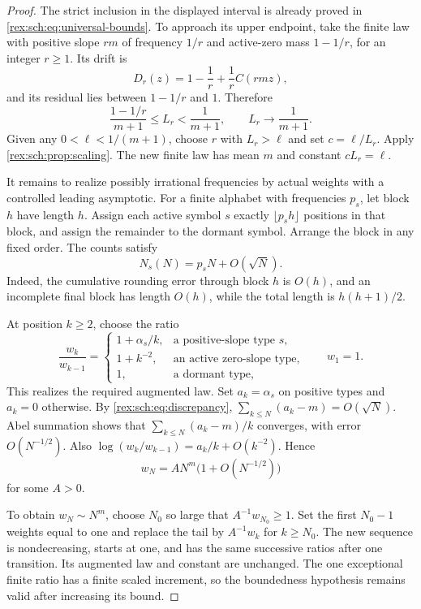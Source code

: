 \begin{proof}
The strict inclusion in the displayed interval is already proved
in \eqref{rex:sch:eq:universal-bounds}. To approach its upper endpoint,
take the finite law with positive slope $rm$ of frequency $1/r$
and active-zero mass $1-1/r$, for an integer $r\geq1$. Its drift is
\[
 D_r(z)=1-\frac1r+\frac1r C(rmz),
\]
and its residual lies between $1-1/r$ and $1$. Therefore
\begin{equation}\label{rex:sch:eq:upper-approach}
 \frac{1-1/r}{m+1}\leq L_r<\frac1{m+1},
 \qquad L_r\longrightarrow\frac1{m+1}.
\end{equation}
Given any $0<\ell<1/(m+1)$, choose $r$ with $L_r>\ell$ and
set $c=\ell/L_r$. Apply \cref{rex:sch:prop:scaling}. The new finite law
has mean $m$ and constant $cL_r=\ell$.

It remains to realize possibly irrational frequencies by actual
weights with a controlled leading asymptotic. For a finite
alphabet with frequencies $p_s$, let block $h$ have length $h$.
Assign each active symbol $s$ exactly $\lfloor p_sh\rfloor$
positions in that block, and assign the remainder to the dormant
symbol. Arrange the block in any fixed order. The counts satisfy
\begin{equation}\label{rex:sch:eq:discrepancy}
 N_s(N)=p_sN+O(\sqrt N).
\end{equation}
Indeed, the cumulative rounding error through block $h$ is $O(h)$,
and an incomplete final block has length $O(h)$, while the total
length is $h(h+1)/2$.

At position $k\geq2$, choose the ratio
\begin{equation}\label{rex:sch:eq:realization-ratios}
 \frac{w_k}{w_{k-1}}=
 \begin{cases}
 1+\alpha_s/k,&\text{a positive-slope type }s,\\
 1+k^{-2},&\text{an active zero-slope type},\\
 1,&\text{a dormant type},
 \end{cases}
 \qquad w_1=1.
\end{equation}
This realizes the required augmented law. Set $a_k=\alpha_s$
on positive types and $a_k=0$ otherwise. By
\eqref{rex:sch:eq:discrepancy},
$\sum_{k\leq N}(a_k-m)=O(\sqrt N)$. Abel summation shows that
$\sum_{k\leq N}(a_k-m)/k$ converges, with error $O(N^{-1/2})$.
Also $\log(w_k/w_{k-1})=a_k/k+O(k^{-2})$. Hence
\begin{equation}\label{rex:sch:eq:realization-weight}
 w_N=A N^m\bigl(1+O(N^{-1/2})\bigr)
\end{equation}
for some $A>0$.

To obtain $w_N\sim N^m$, choose $N_0$ so large that
$A^{-1}w_{N_0}\geq1$. Set the first $N_0-1$ weights equal to
one and replace the tail by $A^{-1}w_k$ for $k\geq N_0$.
The new sequence is nondecreasing, starts at one, and has the same
successive ratios after one transition. Its augmented law and
constant are unchanged. The one exceptional finite ratio has a
finite scaled increment, so the boundedness hypothesis remains
valid after increasing its bound.
\end{proof}

